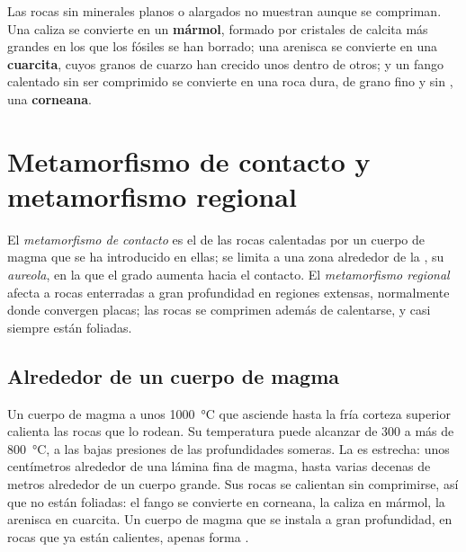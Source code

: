Las rocas sin minerales planos o alargados no muestran  aunque se
compriman. Una caliza se convierte en un \textbf{mármol}, formado por
cristales de calcita más grandes en los que los fósiles se han borrado; una
arenisca se convierte en una \textbf{cuarcita}, cuyos granos de cuarzo han
crecido unos dentro de otros; y un fango calentado sin ser comprimido se
convierte en una roca dura, de grano fino y sin , una
\textbf{corneana}.

\section{Metamorfismo de contacto y metamorfismo regional}

\begin{definition}\label{def:g12:metamorphic-rocks:contact-regional}
El \emph{metamorfismo de contacto} es el
 de las rocas calentadas por un cuerpo de magma que se ha
introducido en ellas; se limita a una zona alrededor de la , su
\emph{aureola}, en la que el grado aumenta hacia el contacto.
El \emph{metamorfismo
regional} afecta a rocas enterradas a gran
profundidad en regiones extensas, normalmente donde convergen placas; las
rocas se comprimen además de calentarse, y casi siempre están foliadas.
\end{definition}

\subsection{Alrededor de un cuerpo de magma}

Un cuerpo de magma a unos \qty{1000}{\celsius} que asciende hasta la fría
corteza superior calienta las rocas que lo rodean. Su temperatura puede
alcanzar de 300 a más de \qty{800}{\celsius}, a las bajas presiones de las
profundidades someras. La  es estrecha: unos centímetros alrededor de
una lámina fina de magma, hasta varias decenas de metros alrededor de un
cuerpo grande. Sus rocas se calientan sin comprimirse, así que no están
foliadas: el fango se convierte en corneana, la caliza en mármol, la arenisca
en cuarcita. Un cuerpo de magma que se instala a gran profundidad, en rocas
que ya están calientes, apenas forma .

